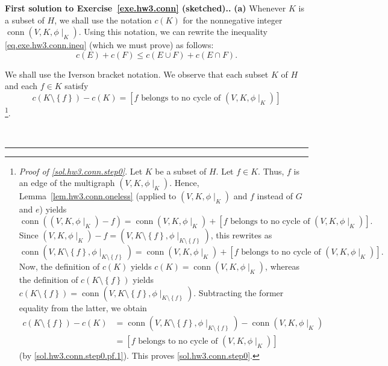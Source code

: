 \documentclass[numbers=enddot,12pt,final,onecolumn,notitlepage]{scrartcl}%
\theoremstyle{definition}
\newenvironment{proof}[1][Proof]{\noindent\textbf{#1.} }{\ \rule{0.5em}{0.5em}}
\newcommand{\conn}{\operatorname{conn}}
\newcommand{\set}[1]{\left\{ #1 \right\}}
\newcommand{\tup}[1]{\left( #1 \right)}
\newcommand{\ive}[1]{\left[ #1 \right]}
\begin{document}
\begin{proof}[First solution to Exercise~\ref{exe.hw3.conn}
(sketched).]
\textbf{(a)}
Whenever $K$ is a subset of $H$,
we shall use the notation $c\tup{K}$ for the nonnegative
integer $\conn \tup{V, K, \phi\mid_K}$.
Using this notation, we can rewrite the inequality
\eqref{eq.exe.hw3.conn.ineq} (which we must prove)
as follows:
\begin{equation}
c\tup{E} + c\tup{F} \leq c\tup{E \cup F} + c\tup{E \cap F} .
\label{sol.hw3.conn.ineq}
\end{equation}

We shall use the Iverson bracket notation.
We observe that each subset $K$ of $H$ and each $f \in K$ satisfy
\begin{equation}
c\tup{K \setminus \set{f}} - c\tup{K}
= \ive{f \text{ belongs to no cycle of } \tup{V, K, \phi\mid_K}}
\label{sol.hw3.conn.step0}
\end{equation}
\footnote{\textit{Proof of \eqref{sol.hw3.conn.step0}}.
  Let $K$ be a subset of $H$. Let $f \in K$.
  Thus, $f$ is an edge of the multigraph $\tup{V, K, \phi\mid_K}$.
  Hence, Lemma~\ref{lem.hw3.conn.oneless} (applied to
  $\tup{V, K, \phi\mid_K}$ and $f$ instead of $G$ and $e$) yields
  \[
  \conn \tup{ \tup{V, K, \phi\mid_K} - f }
  = \conn \tup{V, K, \phi\mid_K}
    + \ive{f \text{ belongs to no cycle of } \tup{V, K, \phi\mid_K}} .
  \]
  Since
  $\tup{V, K, \phi\mid_K} - f
  = \tup{V, K \setminus \set{f}, \phi\mid_{K \setminus \set{f}}}$,
  this rewrites as
  \begin{equation}
  \conn \tup{V, K \setminus \set{f}, \phi\mid_{K \setminus \set{f}}}
  = \conn \tup{V, K, \phi\mid_K}
    + \ive{f \text{ belongs to no cycle of } \tup{V, K, \phi\mid_K}} .
  \label{sol.hw3.conn.step0.pf.1}
  \end{equation}
  Now, the definition of $c\tup{K}$ yields
  $c\tup{K} = \conn \tup{V, K, \phi\mid_K}$, whereas the definition of
  $c\tup{K \setminus \set{f}}$
  yields
  $c\tup{K \setminus \set{f}} =
  \conn \tup{V, K \setminus \set{f}, \phi\mid_{K \setminus \set{f}}}$.
  Subtracting the former equality from the latter, we obtain
  \begin{align*}
  c\tup{K \setminus \set{f}} - c\tup{K}
  &=
  \conn \tup{V, K \setminus \set{f}, \phi\mid_{K \setminus \set{f}}}
  - \conn \tup{V, K, \phi\mid_K} \\
  &= \ive{f \text{ belongs to no cycle of } \tup{V, K, \phi\mid_K}}
  \end{align*}
  (by \eqref{sol.hw3.conn.step0.pf.1}).
  This proves \eqref{sol.hw3.conn.step0}.}.


\end{proof}
\end{document}
